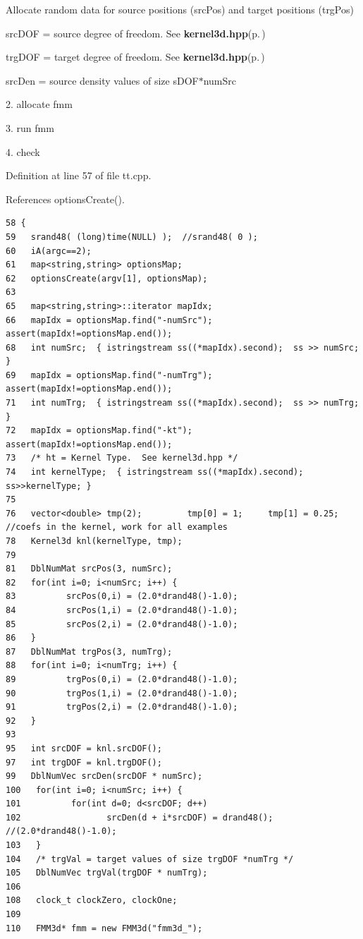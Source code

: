 Allocate random data for source positions (src\-Pos) and target positions (trg\-Pos)

src\-DOF = source degree of freedom. See {\bf kernel3d.hpp}{\rm (p.\,\pageref{kernel3d_8hpp})}

trg\-DOF = target degree of freedom. See {\bf kernel3d.hpp}{\rm (p.\,\pageref{kernel3d_8hpp})}

src\-Den = source density values of size s\-DOF$\ast$num\-Src

2. allocate fmm

3. run fmm

4. check 

Definition at line 57 of file tt.cpp.

References options\-Create().

\footnotesize\begin{verbatim}58 {
59   srand48( (long)time(NULL) );  //srand48( 0 );
60   iA(argc==2);
61   map<string,string> optionsMap;
62   optionsCreate(argv[1], optionsMap);
63   
65   map<string,string>::iterator mapIdx;
66   mapIdx = optionsMap.find("-numSrc"); assert(mapIdx!=optionsMap.end());
68   int numSrc;  { istringstream ss((*mapIdx).second);  ss >> numSrc; }
69   mapIdx = optionsMap.find("-numTrg"); assert(mapIdx!=optionsMap.end());
71   int numTrg;  { istringstream ss((*mapIdx).second);  ss >> numTrg; }
72   mapIdx = optionsMap.find("-kt"); assert(mapIdx!=optionsMap.end());
73   /* ht = Kernel Type.  See kernel3d.hpp */
74   int kernelType;  { istringstream ss((*mapIdx).second);  ss>>kernelType; }
75     
76   vector<double> tmp(2);         tmp[0] = 1;     tmp[1] = 0.25; //coefs in the kernel, work for all examples
78   Kernel3d knl(kernelType, tmp);
79 
81   DblNumMat srcPos(3, numSrc);
82   for(int i=0; i<numSrc; i++) {
83          srcPos(0,i) = (2.0*drand48()-1.0);
84          srcPos(1,i) = (2.0*drand48()-1.0);
85          srcPos(2,i) = (2.0*drand48()-1.0);
86   }
87   DblNumMat trgPos(3, numTrg);
88   for(int i=0; i<numTrg; i++) {
89          trgPos(0,i) = (2.0*drand48()-1.0);
90          trgPos(1,i) = (2.0*drand48()-1.0);
91          trgPos(2,i) = (2.0*drand48()-1.0);
92   }
93 
95   int srcDOF = knl.srcDOF();
97   int trgDOF = knl.trgDOF();
99   DblNumVec srcDen(srcDOF * numSrc);
100   for(int i=0; i<numSrc; i++) {
101          for(int d=0; d<srcDOF; d++)
102                 srcDen(d + i*srcDOF) = drand48(); //(2.0*drand48()-1.0);
103   }
104   /* trgVal = target values of size trgDOF *numTrg */
105   DblNumVec trgVal(trgDOF * numTrg);
106   
108   clock_t clockZero, clockOne;
109   
110   FMM3d* fmm = new FMM3d("fmm3d_");

\end{verbatim}
